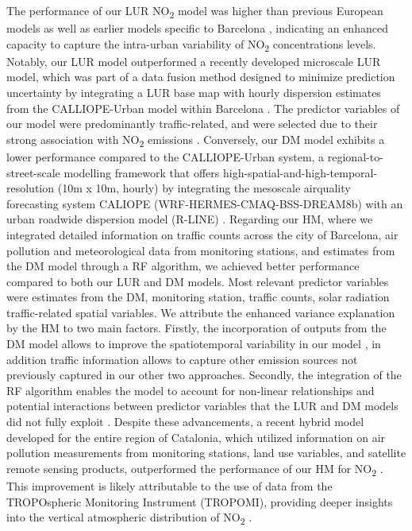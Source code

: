 \documentclass{article}
\begin{document}
The performance of our LUR NO\textsubscript{2} model was higher than previous European models \cite{rivera2012} as well as earlier models specific to Barcelona \cite{criado2023}, indicating an enhanced capacity to capture the intra-urban variability of NO\textsubscript{2} concentrations levels. Notably, our LUR model outperformed a recently developed microscale LUR model, which was part of a data fusion method designed to minimize prediction uncertainty by integrating a LUR base map with hourly dispersion estimates from the CALLIOPE-Urban model within Barcelona \cite{criado2023}. The predictor variables of our model were predominantly traffic-related, and were selected due to their strong association with NO\textsubscript{2} emissions \cite{casallas2018}. Conversely, our DM model exhibits a lower performance compared to the CALLIOPE-Urban system, a regional-to-street-scale modelling framework that offers high-spatial-and-high-temporal-resolution (10m x 10m, hourly) by integrating the mesoscale airquality forecasting system CALIOPE (WRF-HERMES-CMAQ-BSS-DREAM8b) with an urban roadwide dispersion model (R-LINE) \cite{benavides2019}. Regarding our HM, where we integrated detailed information on traffic counts across the city of Barcelona, air pollution and meteorological data from monitoring stations, and estimates from the DM model through a RF algorithm, we achieved better performance compared to both our LUR and DM models. Most relevant predictor variables were estimates from the DM, monitoring station, traffic counts, solar radiation traffic-related spatial variables. We attribute the enhanced variance explanation by the HM to two main factors. Firstly, the incorporation of outputs from the DM model allows to improve the spatiotemporal variability in our model \cite{michanowicz2016, korek2017}, in addition traffic information allows to capture other emission sources not previously captured \cite{pinto2020} in our other two approaches. Secondly, the integration of the RF algorithm enables the model to account for non-linear relationships and potential interactions between predictor variables that the LUR and DM models did not fully exploit \cite{araki2018, chen2019}. Despite these advancements, a recent hybrid model developed for the entire region of Catalonia, which utilized information on air pollution measurements from monitoring stations, land use variables, and satellite remote sensing products, outperformed the performance of our HM for NO\textsubscript{2} \cite{mila2023}. This improvement is likely attributable to the use of data from the TROPOspheric Monitoring Instrument (TROPOMI), providing deeper insights into the vertical atmospheric distribution of NO\textsubscript{2} \cite{petetin2023}.\\ 
\end{document}
